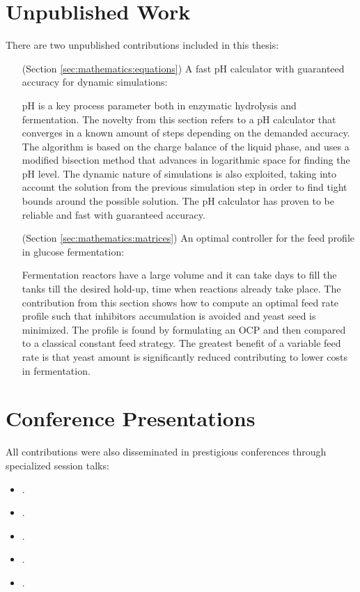 \section*{Unpublished Work}
There are two unpublished contributions included in this thesis:
\begin{enumerate}[labelindent=\parindent, leftmargin=!, labelwidth=\widthof{(Section 3.4.4)}]
	\item[(Section \ref{sec:mathematics:equations})] A fast pH calculator with guaranteed accuracy for dynamic simulations:
	
	pH is a key process parameter both in enzymatic hydrolysis and fermentation. The novelty from this section refers to a pH calculator that converges in a known amount of steps depending on the demanded accuracy. The algorithm is based on the charge balance of the liquid phase, and uses a modified bisection method that advances in logarithmic space for finding the pH level. The dynamic nature of simulations is also exploited, taking into account the solution from the previous simulation step in order to find tight bounds around the possible solution. The pH calculator has proven to be reliable and fast with guaranteed accuracy.
	
	\item[(Section \ref{sec:mathematics:matrices})] An optimal controller for the feed profile in glucose fermentation:
	
	Fermentation reactors have a large volume and it can take days to fill the tanks till the desired hold-up, time when reactions already take place. The contribution from this section shows how to compute an optimal feed rate profile such that inhibitors accumulation is avoided and yeast seed is minimized. The profile is found by formulating an \gls{OCP} and then compared to a classical constant feed strategy. The greatest benefit of a variable feed rate is that yeast amount is significantly reduced contributing to lower costs in fermentation.
	
\end{enumerate}

\section*{Conference Presentations}
All contributions were also disseminated in prestigious conferences through specialized session talks:
\begin{itemize}
	\item {}.
	\item {}.
	\item {}.
	\item {}.
	\item {}.
\end{itemize}